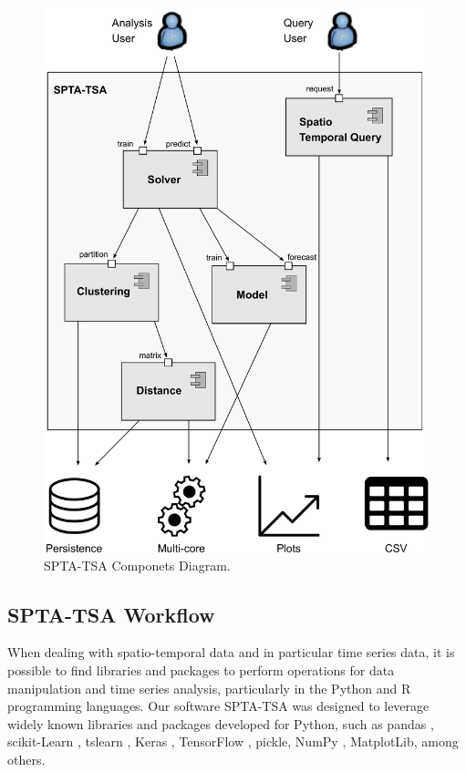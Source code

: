 \begin{figure}[tp]
	\centering
	\includegraphics[scale=0.25]{../Figures/arch_spta}
	\caption{SPTA-TSA Componets Diagram.}	
	\label{Fig:architecture_spta_tsa}
\end{figure}


\subsection{SPTA-TSA Workflow}
\label{Sec:SPTA-TSA_Workflow}

When dealing with spatio-temporal data and in particular time series data, it is possible to find libraries and packages to perform operations for data manipulation and time series analysis, particularly in the Python and R programming languages. Our software SPTA-TSA was designed to leverage widely known libraries and packages developed for Python, such as pandas \cite{McKinney2010}, scikit-Learn \cite{scikit-learn2011}, tslearn \cite{tslearn2020}, Keras \cite{Chollet2015}, TensorFlow \cite{tensorflow2016}, pickle, NumPy \cite{Harris2020}, MatplotLib, among others.

